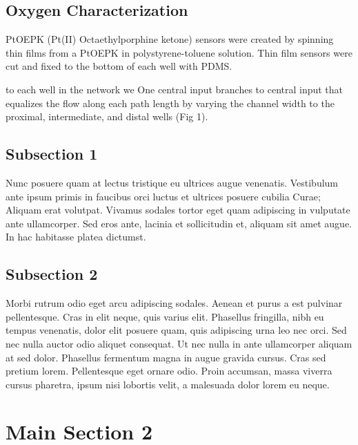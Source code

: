 \subsection{Oxygen Characterization}
PtOEPK (Pt(II) Octaethylporphine ketone) sensors were created by spinning thin films from a PtOEPK in polystyrene-toluene solution.
Thin film sensors were cut and fixed to the bottom of each well with PDMS.


 to each well in the network we
One central input branches to central input that equalizes the flow along each path length by varying the channel width to the proximal, intermediate, and distal wells (Fig 1). 

\subsection{Subsection 1}

Nunc posuere quam at lectus tristique eu ultrices augue venenatis. Vestibulum ante ipsum primis in faucibus orci luctus et ultrices posuere cubilia Curae; Aliquam erat volutpat. Vivamus sodales tortor eget quam adipiscing in vulputate ante ullamcorper. Sed eros ante, lacinia et sollicitudin et, aliquam sit amet augue. In hac habitasse platea dictumst.


\subsection{Subsection 2}
Morbi rutrum odio eget arcu adipiscing sodales. Aenean et purus a est pulvinar pellentesque. Cras in elit neque, quis varius elit. Phasellus fringilla, nibh eu tempus venenatis, dolor elit posuere quam, quis adipiscing urna leo nec orci. Sed nec nulla auctor odio aliquet consequat. Ut nec nulla in ante ullamcorper aliquam at sed dolor. Phasellus fermentum magna in augue gravida cursus. Cras sed pretium lorem. Pellentesque eget ornare odio. Proin accumsan, massa viverra cursus pharetra, ipsum nisi lobortis velit, a malesuada dolor lorem eu neque.


\section{Main Section 2}


